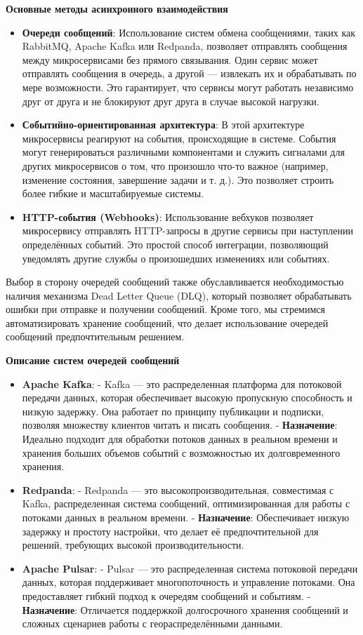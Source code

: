 \textbf{Основные методы асинхронного взаимодействия}
\begin{itemize}
    \item \textbf{Очереди сообщений}: Использование систем обмена сообщениями, таких как RabbitMQ, Apache Kafka или Redpanda, позволяет отправлять сообщения между микросервисами без прямого связывания. Один сервис может отправлять сообщения в очередь, а другой — извлекать их и обрабатывать по мере возможности. Это гарантирует, что сервисы могут работать независимо друг от друга и не блокируют друг друга в случае высокой нагрузки.
    \item \textbf{Событийно-ориентированная архитектура}: В этой архитектуре микросервисы реагируют на события, происходящие в системе. События могут генерироваться различными компонентами и служить сигналами для других микросервисов о том, что произошло что-то важное (например, изменение состояния, завершение задачи и т. д.). Это позволяет строить более гибкие и масштабируемые системы.
    \item \textbf{HTTP-события (Webhooks)}: Использование вебхуков позволяет микросервису отправлять HTTP-запросы в другие сервисы при наступлении определённых событий. Это простой способ интеграции, позволяющий уведомлять другие службы о произошедших изменениях или событиях.
\end{itemize}

Выбор в сторону очередей сообщений также обуславливается необходимостью наличия механизма Dead Letter Queue (DLQ), который позволяет обрабатывать ошибки при отправке и получении сообщений. Кроме того, мы стремимся автоматизировать хранение сообщений, что делает использование очередей сообщений предпочтительным решением.

\textbf{Описание систем очередей сообщений}
\begin{itemize}
    \item \textbf{Apache Kafka}:
            - Kafka — это распределенная платформа для потоковой передачи данных, которая обеспечивает высокую пропускную способность и низкую задержку. Она работает по принципу публикации и подписки, позволяя множеству клиентов читать и писать сообщения.
            - \textbf{Назначение}: Идеально подходит для обработки потоков данных в реальном времени и хранения больших объемов событий с возможностью их долговременного хранения.
    \item \textbf{Redpanda}:
            - Redpanda — это высокопроизводительная, совместимая с Kafka, распределенная система сообщений, оптимизированная для работы с потоками данных в реальном времени.
            - \textbf{Назначение}: Обеспечивает низкую задержку и простоту настройки, что делает её предпочтительной для решений, требующих высокой производительности. 
    \item \textbf{Apache Pulsar}:
            - Pulsar — это распределенная система потоковой передачи данных, которая поддерживает многопоточность и управление потоками. Она предоставляет гибкий подход к очередям сообщений и событиям.
            - \textbf{Назначение}: Отличается поддержкой долгосрочного хранения сообщений и сложных сценариев работы с геораспределёнными данными.
\end{itemize}

